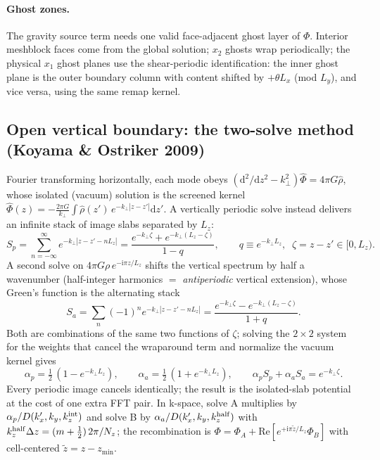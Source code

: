 \documentclass[11pt]{article}
\newcommand{\kperp}{k_\perp}
\begin{document}
\paragraph{Ghost zones.} The gravity source term needs one valid face-adjacent ghost
layer of $\Phi$. Interior meshblock faces come from the global solution; $x_2$
ghosts wrap periodically; the physical $x_1$ ghost planes use the shear-periodic
identification: the inner ghost plane is the outer boundary column with content
shifted by $+\theta L_x$ (mod $L_y$), and vice versa, using the same remap kernel.

\subsection{Open vertical boundary: the two-solve method (Koyama \& Ostriker 2009)}
\label{sec:openbc}
Fourier transforming horizontally, each mode obeys
$(\mathrm{d}^2/\mathrm{d}z^2 - \kperp^2)\hat\Phi = 4\pi G\hat\rho$, whose isolated
(vacuum) solution is the screened kernel
$\hat\Phi(z) = -\tfrac{2\pi G}{\kperp}\!\int\!\hat\rho(z')\,
e^{-\kperp|z-z'|}\mathrm{d}z'$.
A vertically periodic solve instead delivers an infinite stack of image slabs
separated by $L_z$:
\begin{equation}
  S_p = \sum_{n=-\infty}^{\infty} e^{-\kperp|z-z'-nL_z|}
      = \frac{e^{-\kperp\zeta}+e^{-\kperp(L_z-\zeta)}}{1-q},
  \qquad q\equiv e^{-\kperp L_z},\;\; \zeta = z-z' \in[0,L_z).
\end{equation}
A second solve on $4\pi G\rho\,e^{-\mathrm{i}\pi z/L_z}$ shifts the vertical
spectrum by half a wavenumber (half-integer harmonics $=$ \emph{antiperiodic}
vertical extension), whose Green's function is the alternating stack
\begin{equation}
  S_a = \sum_{n} (-1)^n e^{-\kperp|z-z'-nL_z|}
      = \frac{e^{-\kperp\zeta}-e^{-\kperp(L_z-\zeta)}}{1+q}.
\end{equation}
Both are combinations of the same two functions of $\zeta$; solving the
$2\times2$ system for the weights that cancel the wraparound term and normalize
the vacuum kernel gives
\begin{equation}
  \boxed{\;\alpha_p = \tfrac12\,(1 - e^{-\kperp L_z}), \qquad
         \alpha_a = \tfrac12\,(1 + e^{-\kperp L_z}),\qquad
         \alpha_p S_p + \alpha_a S_a = e^{-\kperp\zeta}. \;}
\end{equation}
Every periodic image cancels identically; the result is the isolated-slab
potential at the cost of one extra FFT pair. In k-space, solve A multiplies by
$\alpha_p/D(k_x',k_y,k_z^{\rm int})$ and solve B by
$\alpha_a/D(k_x',k_y,k_z^{\rm half})$ with $k_z^{\rm half}\Delta z =
(m+\tfrac12)\,2\pi/N_z$; the recombination is
$\Phi = \Phi_A + \mathrm{Re}\!\left[e^{+\mathrm{i}\pi \tilde z/L_z}\Phi_B\right]$
with cell-centered $\tilde z = z - z_{\min}$.
\end{document}
